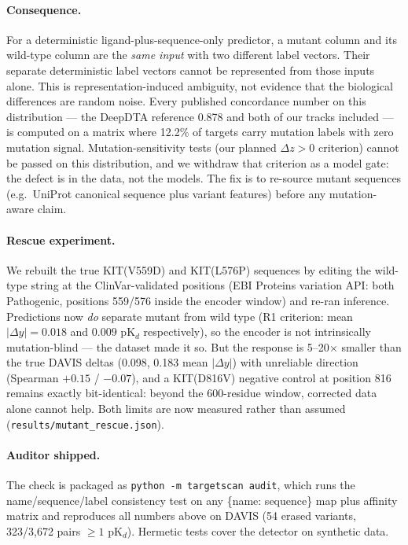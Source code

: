 \documentclass[11pt]{article}
\begin{document}
\paragraph{Consequence.} For a deterministic ligand-plus-sequence-only predictor, a
mutant column and its wild-type column are the \emph{same input} with two
different label vectors. Their separate deterministic label vectors cannot
be represented from those inputs alone. This is representation-induced
ambiguity, not evidence that the biological differences are random noise. Every published concordance number on this distribution ---
the DeepDTA reference 0.878 and both of our tracks included --- is
computed on a matrix where 12.2\% of targets carry mutation labels with
zero mutation signal. Mutation-sensitivity tests (our planned
$\Delta z > 0$ criterion) cannot be passed on this distribution, and we
withdraw that criterion as a model gate: the defect is in the data, not
the models. The fix is to re-source mutant sequences (e.g.\ UniProt
canonical sequence plus variant features) before any mutation-aware claim.
\paragraph{Rescue experiment.} We rebuilt the true KIT(V559D) and
KIT(L576P) sequences by editing the wild-type string at the
ClinVar-validated positions (EBI Proteins variation API: both Pathogenic,
positions 559/576 inside the encoder window) and re-ran inference.
Predictions now \emph{do} separate mutant from wild type (R1 criterion:
mean $|\Delta\hat y| = 0.018$ and $0.009$ pK$_d$ respectively), so the
encoder is not intrinsically mutation-blind --- the dataset made it so.
But the response is 5--20$\times$ smaller than the true DAVIS deltas
(0.098, 0.183 mean $|\Delta y|$) with unreliable direction (Spearman
$+0.15$ / $-0.07$), and a KIT(D816V) negative control at position 816
remains exactly bit-identical: beyond the 600-residue window, corrected
data alone cannot help. Both limits are now measured rather than assumed
(\texttt{results/mutant\_rescue.json}).
\paragraph{Auditor shipped.} The check is packaged as
\texttt{python -m targetscan audit}, which runs the name/sequence/label
consistency test on any \{name: sequence\} map plus affinity matrix and
reproduces all numbers above on DAVIS (54 erased variants, 323/3{,}672
pairs $\ge 1$ pK$_d$). Hermetic tests cover the detector on synthetic
data.
\end{document}
